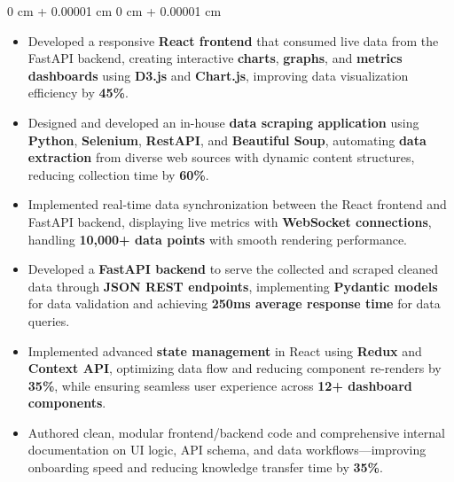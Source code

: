 \documentclass[10pt, letterpaper]{article}
\newenvironment{highlights}{
    \begin{itemize}[
        topsep=0.10 cm,
        parsep=0.10 cm,
        partopsep=0pt,
        itemsep=0pt,
        leftmargin=0 cm + 10pt
    ]
}{
    \end{itemize}
} %
\newenvironment{onecolentry}{
    \begin{adjustwidth}{
        0 cm + 0.00001 cm
    }{
        0 cm + 0.00001 cm
    }
}{
    \end{adjustwidth}
} %
\begin{document}
\begin{onecolentry}
	\begin{highlights}
		\item Developed a responsive \textbf{React frontend} that consumed live data from the FastAPI backend, creating interactive \textbf{charts}, \textbf{graphs}, and \textbf{metrics dashboards} using \textbf{D3.js} and \textbf{Chart.js}, improving data visualization efficiency by \textbf{45\%}.
		\item Designed and developed an in-house \textbf{data scraping application} using \textbf{Python}, \textbf{Selenium}, \textbf{RestAPI}, and \textbf{Beautiful Soup}, automating \textbf{data extraction} from diverse web sources with dynamic content structures, reducing collection time by \textbf{60\%}.
		\item Implemented real-time data synchronization between the React frontend and FastAPI backend, displaying live metrics with \textbf{WebSocket connections}, handling \textbf{10,000+ data points} with smooth rendering performance.
		\item Developed a \textbf{FastAPI backend} to serve the collected and scraped cleaned data through \textbf{JSON REST endpoints}, implementing \textbf{Pydantic models} for data validation and achieving \textbf{250ms average response time} for data queries.
		\item Implemented advanced \textbf{state management} in React using \textbf{Redux} and \textbf{Context API}, optimizing data flow and reducing component re-renders by \textbf{35\%}, while ensuring seamless user experience across \textbf{12+ dashboard components}.
		\item Authored clean, modular frontend/backend code and comprehensive internal documentation on UI logic, API schema, and data workflows—improving onboarding speed and reducing knowledge transfer time by \textbf{35\%}.
\end{highlights}
\end{onecolentry}
\end{document}
